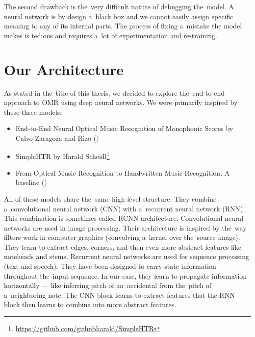 The second drawback is the~very difficult nature of debugging the~model. A neural network is by design a~black box and we cannot easily assign specific meaning to any of its internal parts. The process of fixing a~mistake the model makes is tedious and requires a~lot of experimentation and re-training.


\section{Our Architecture}

As stated in the~title of this thesis, we decided to explore the~end-to-end approach to OMR using deep neural networks. We were primarily inspired by these three models:

\begin{itemize}
\item End-to-End Neural Optical Music Recognition of Monophonic Scores by Calvo-Zaragoza and Rizo (\cite{Primus})
\item SimpleHTR by Harald Scheidl\footnote{\href{https://github.com/githubharald/SimpleHTR}{https://github.com/githubharald/SimpleHTR}}
\item From Optical Music Recognition to Handwritten Music Recognition: A baseline (\cite{HmrBaseline})
\end{itemize}

All of these models share the~same high-level structure. They combine a~convolutional neural network (CNN) with a~recurrent neural network (RNN). This combination is sometimes called RCNN architecture. Convolutional neural networks are used in image processing. Their architecture is inspired by the~way filters work in computer graphics (convolving a~kernel over the~source image). They learn to extract edges, corners, and then even more abstract features like noteheads and stems. Recurrent neural networks are used for sequence processing (text and speech). They have been designed to carry state information throughout the~input sequence. In our case, they learn to propagate information horizontally --- like inferring pitch of an~accidental from the~pitch of a~neighboring note. The CNN block learns to extract features that the RNN block then learns to combine into more abstract features.

